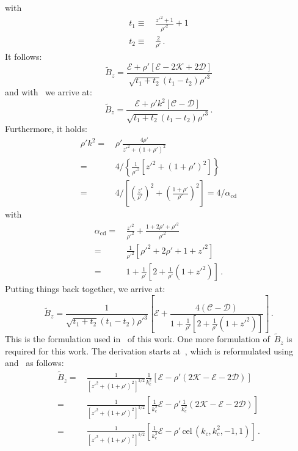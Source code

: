with
\begin{align}
  t_1 \equiv&\, \frac{z'^2 + 1}{\rho'^2} + 1 \\
  t_2 \equiv&\, \frac{2}{\rho'} \, .
\end{align}
It follows:
\begin{equation}
  \tilde{B}_z
 = \frac{\mathcal{E} + \rho' \left[\mathcal{E} - 2 \mathcal{K} + 2 \mathcal{D} \right]}
        {\sqrt{t_1 + t_2} (t_1 - t_2) \rho'^3}
\end{equation}
and with~ we arrive at:
\begin{equation}
  \tilde{B}_z
 = \frac{\mathcal{E} + \rho' k^2 \left[\mathcal{C} - \mathcal{D} \right]}
        {\sqrt{t_1 + t_2} (t_1 - t_2) \rho'^3} \, .
\end{equation}
Furthermore, it holds:
\begin{align}
  \rho' k^2
 =&\, \rho' \frac{4 \rho'}{z'^2 + (1 + \rho')^2} \nonumber \\
 =&\, 4 / \left\{ \frac{1}{\rho'^2} \left[ z'^2 + (1 + \rho')^2 \right] \right\} \nonumber \\
 =&\, 4 / \left[ \left( \frac{z'}{\rho'} \right)^2 + \left( \frac{1 + \rho'}{\rho'} \right)^2 \right]
 = 4 / \alpha_\textrm{cd}
\end{align}
with
\begin{align}
  \alpha_\textrm{cd}
 =&\, \frac{z'^2}{\rho'^2} + \frac{1 + 2 \rho' + \rho'^2}{\rho'^2} \nonumber \\
 =&\, \frac{1}{\rho'^2} \left[ \rho'^2 + 2 \rho' + 1 + z'^2 \right] \nonumber \\
 =&\, 1 + \frac{1}{\rho'} \left[ 2 + \frac{1}{\rho'} \left( 1 + z'^2 \right) \right] \, .
\end{align}
Putting things back together, we arrive at:
\begin{equation}
  \tilde{B}_z
 = \frac{1}{\sqrt{t_1 + t_2} (t_1 - t_2) \rho'^3}
   \left[
     \mathcal{E} + \frac{4 \left(\mathcal{C} - \mathcal{D} \right)}{1 + \frac{1}{\rho'} \left[ 2 + \frac{1}{\rho'} \left( 1 + z'^2 \right) \right]}
   \right] \label{eqn:cwl_B_z_f2_derivation} \, .
\end{equation}
This is the formulation used in~ of this work.
One more formulation of~$\tilde{B}_z$ is required for this work.
The derivation starts at~, which is reformulated
using~ and~ as follows:
\begin{align}
 \tilde{B}_z
 =&\, \frac{1}{\left[z'^2 + (1 + \rho')^2\right]^{3/2}} \frac{1}{k_c^2}
      \left[ \mathcal{E} -\rho' \left( 2 \mathcal{K} - \mathcal{E} - 2 \mathcal{D} \right) \right] \nonumber \\
 =&\, \frac{1}{\left[z'^2 + (1 + \rho')^2\right]^{3/2}}
      \left[ \frac{1}{k_c^2} \mathcal{E} - \rho' \frac{1}{k_c^2} \left( 2 \mathcal{K} - \mathcal{E} - 2 \mathcal{D} \right) \right] \nonumber \\
 =&\, \frac{1}{\left[z'^2 + (1 + \rho')^2\right]^{3/2}}
      \left[ \frac{1}{k_c^2} \mathcal{E} - \rho' \,\textrm{cel}\,(k_c, k_c^2, -1, 1) \right] \, .
\end{align}
